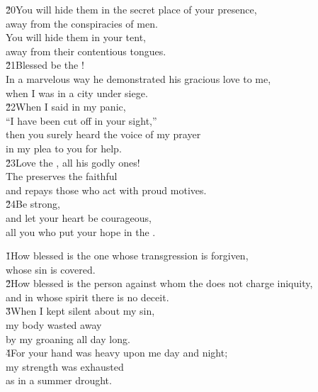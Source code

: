 \begin{poetry}
\poeml \v{20}You will hide them in the secret place of your presence, \\
\poemll    away from the conspiracies of men. \\
\poeml You will hide them in your tent, \\
\poemll    away from their contentious tongues. \\
\poeml \v{21}Blessed be the ! \\
\poemll    In a marvelous way he demonstrated his gracious love to me, \\
\poemlll       when I was in a city under siege. \\
\poeml \v{22}When I said in my panic, \\
\poemll    ``I have been cut off in your sight,'' \\
\poeml then you surely heard the voice of my prayer \\
\poemll    in my plea to you for help. \\
\poeml \v{23}Love the , all his godly ones! \\
\poemll    The  preserves the faithful \\
\poemlll       and repays those who act with proud motives. \\
\poeml \v{24}Be strong, \\
\poemll    and let your heart be courageous, \\
\poemlll       all you who put your hope in the .
\end{poetry}

\begin{poetry}
\poeml \v{1}How blessed is the one whose transgression is forgiven, \\
\poemll    whose sin is covered. \\
\poeml \v{2}How blessed is the person against whom the  does not charge iniquity, \\
\poemll    and in whose spirit there is no deceit. \\
\poeml \v{3}When I kept silent about my sin, \\
\poemll    my body wasted away \\
\poemlll       by my groaning all day long. \\
\poeml \v{4}For your hand was heavy upon me day and night; \\
\poemll    my strength was exhausted \\
\poemlll       as in a summer drought.
\end{poetry}


